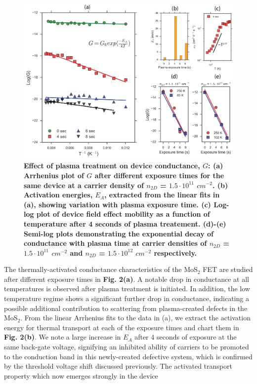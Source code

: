 \documentclass[%
 aip,
 jmp,%
 amsmath,amssymb,
 reprint,%
]{revtex4-1}
\begin{document}
{\setlength\intextsep{5pt}
\begin{figure}
\centering
\includegraphics[width=\columnwidth]{Figs_2.png}
\caption{{\footnotesize \textbf{Effect of plasma treatment on device conductance, $G$: (a) Arrhenius plot of $G$ after different exposure times for the same device at a carrier density of $n_{2D}$ = $1.5\cdot 10^{11}$ $cm^{-2}$. (b) Activation energies, $E_A$, extracted from the linear fits in (a), showing variation with plasma exposure time. (c) Log-log plot of device field effect mobility as a function of temperature after 4 seconds of plasma treatement. (d)-(e) Semi-log plots demonstrating the exponential decay of conductance with plasma time at carrier densities of $n_{2D}$ = $1.5\cdot 10^{11}$ $cm^{-2}$ and $n_{2D}$ = $1.5\cdot 10^{12}$ $cm^{-2}$ respectively. }}}
\label{fig:electrical}
\end{figure}}
The thermally-activated conductance characteristics of the MoS$_2$ FET are studied after different exposure times in \textbf{Fig. 2(a)}. A notable drop in conductance at all temperatures is observed after plasma treatment is initiated. In addition, the low temperature regime shows a significant further drop in conductance, indicating a possible additional contribution to scattering from plasma-created defects in the MoS$_2$. From the linear Arrhenius fits to the data in (a), we extract the activation energy for thermal transport at each of the exposure times and chart them in \textbf{Fig. 2(b)}. We note a large increase in $E_A$ after 4 seconds of exposure at the same back-gate voltage, signifying an inhibited ability of carriers to be promoted to the conduction band in this newly-created defective system, which is confirmed by the threshold voltage shift discussed previously. The activated transport property which now emerges strongly in the device \newline
\end{document}
